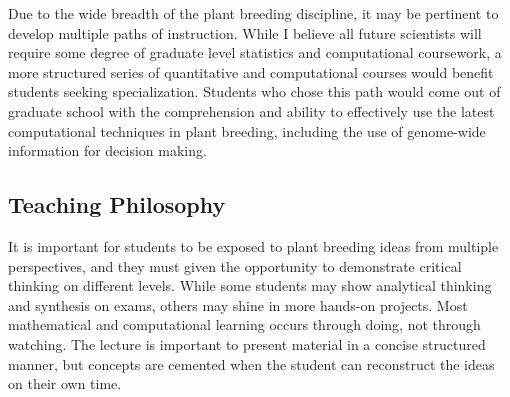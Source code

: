 \documentclass[11pt]{article}
\begin{document}
Due to the wide breadth of the plant breeding discipline, it may be pertinent to develop multiple paths of instruction. While I believe all future scientists will require some degree of graduate level statistics and computational coursework, a more structured series of quantitative and computational courses would benefit students seeking specialization. Students who chose this path would come out of graduate school with the comprehension and ability to effectively use the latest computational techniques in plant breeding, including the use of genome-wide information for decision making.






\subsection*{Teaching Philosophy}

It is important for students to be exposed to plant breeding ideas from multiple perspectives, and they must given the opportunity to demonstrate critical thinking on different levels. While some students may show analytical thinking and synthesis on exams, others may shine in more hands-on projects. Most mathematical and computational learning occurs through doing, not through watching. The lecture is important to present material in a concise structured manner, but concepts are cemented when the student can reconstruct the ideas on their own time.

\end{document}
